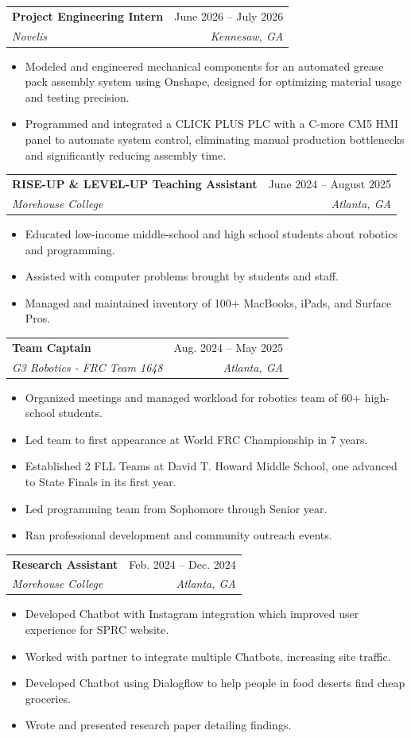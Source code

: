 \documentclass[letterpaper,11pt]{article}
\makeatletter
\newcommand{\resumeItem}[1]{
  \item\small{
    {#1 \vspace{-2pt}}
  }
}
\newcommand{\resumeSubheading}[4]{
  \vspace{-2pt}\item
    \begin{tabular*}{0.97\textwidth}[t]{l@{\extracolsep{\fill}}r}
      \textbf{#1} & #2 \\
      \textit{\small#3} & \textit{\small #4} \\
    \end{tabular*}\vspace{-7pt}
}
\newcommand{\resumeItemListStart}{\begin{itemize}}
\newcommand{\resumeItemListEnd}{\end{itemize}\vspace{-5pt}}
\makeatother
\begin{document}
    \resumeSubheading
      {Project Engineering Intern}{June 2026 -- July 2026}
      {Novelis}{Kennesaw, GA}
      \resumeItemListStart
        \resumeItem{Modeled and engineered mechanical components for an automated grease pack assembly system using Onshape, designed for optimizing material usage and testing precision.}
        \resumeItem{Programmed and integrated a CLICK PLUS PLC with a C-more CM5 HMI panel to automate system control, eliminating manual production bottlenecks and significantly reducing assembly time.}
      \resumeItemListEnd
  
    \resumeSubheading
      {RISE-UP \& LEVEL-UP Teaching Assistant}{June 2024 -- August 2025}
      {Morehouse College}{Atlanta, GA}
      \resumeItemListStart
        \resumeItem{Educated low-income middle-school and high school students about robotics and programming.}
        \resumeItem{Assisted with computer problems brought by students and staff.}
        \resumeItem{Managed and maintained inventory of 100+ MacBooks, iPads, and Surface Pros.}
    \resumeItemListEnd

    \resumeSubheading
      {Team Captain}{Aug. 2024 -- May 2025}
      {G3 Robotics - FRC Team 1648}{Atlanta, GA}
      \resumeItemListStart
        \resumeItem{Organized meetings and managed workload for robotics team of 60+ high-school students.}
        \resumeItem{Led team to first appearance at World FRC Championship in 7 years.}
        \resumeItem{Established 2 FLL Teams at David T. Howard Middle School, one advanced to State Finals in its first year.}
        \resumeItem{Led programming team from Sophomore through Senior year.}
        \resumeItem{Ran professional development and community outreach events.}
      \resumeItemListEnd


    \resumeSubheading
      {Research Assistant}{Feb. 2024 -- Dec. 2024}
      {Morehouse College}{Atlanta, GA}
      \resumeItemListStart
        \resumeItem{Developed Chatbot with Instagram integration which improved user experience for SPRC website.}
        \resumeItem{Worked with partner to integrate multiple Chatbots, increasing site traffic.}
        \resumeItem{Developed Chatbot using Dialogflow to help people in food deserts find cheap groceries.}
        \resumeItem{Wrote and presented research paper detailing findings.}
      \resumeItemListEnd
      
\end{document}
